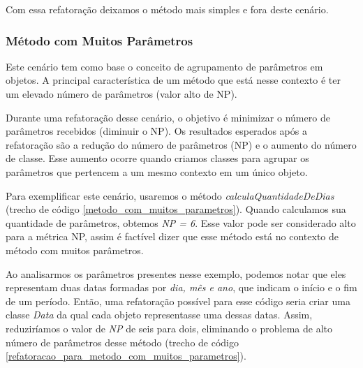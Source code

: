 
              
Com essa refatoração deixamos o método mais simples e fora deste cenário.


\subsubsection{Método com Muitos Parâmetros}
                                                                         
Este cenário tem como base o conceito de agrupamento de parâmetros em objetos. A principal característica de um método que está nesse contexto é ter um elevado número de parâmetros (valor alto de NP).
                                                         
Durante uma refatoração desse cenário, o objetivo é minimizar o número de parâmetros recebidos (diminuir o NP). Os resultados esperados após a refatoração são a redução do número de parâmetros (NP) e o aumento do número de classe. Esse aumento ocorre quando criamos classes para agrupar os parâmetros que pertencem a um mesmo contexto em um único objeto.
	                                               
Para exemplificar este cenário, usaremos o método \textit{calculaQuantidadeDeDias} (trecho de código \ref{metodo_com_muitos_parametros}). Quando calculamos sua quantidade de parâmetros, obtemos \textit{NP = 6}. Esse valor pode ser considerado alto para a métrica NP, assim é factível dizer que esse método está no contexto de método com muitos parâmetros.                    	

                   
                                                                                                        
Ao analisarmos os parâmetros presentes nesse exemplo, podemos notar que eles representam duas datas formadas por \textit{dia, mês e ano}, que indicam o início e o fim de um período. Então, uma refatoração possível para esse código seria criar uma classe \textit{Data} da qual cada objeto representasse uma dessas datas. Assim, reduziríamos o valor de \textit{NP} de seis para dois, eliminando o problema de alto número de parâmetros desse método (trecho de código \ref{refatoracao_para_metodo_com_muitos_parametros}). 
                                                                               
